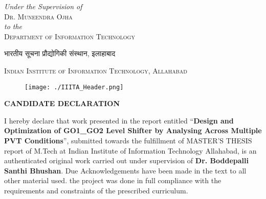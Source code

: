 \begin{spacing}{2.0}
\begin{flushright}
\begin{minipage}{0.5\textwidth}
\begin{titlepage}
\begin{center}
\begin{spacing}{1.2}
\textit{Under the Supervision of}\\[2mm]
\textsc{\Large Dr. Muneendra Ojha}\\%

\vspace{7mm}
\textit{to the}\\[2mm]
\textsc{\Large Department of Information Technology}\\ %

\vspace{8mm}
\begin{hindi}
    \textsc{\Large {भारतीय सूचना प्रौद्योगिकी संस्थान, इलाहाबाद}} \\
\end{hindi}
\vspace{3mm}
\textsc{\Large Indian Institute of Information Technology, Allahabad} %

\vspace{5mm}
{\fontsize{14}{14}\selectfont {}}


\end{spacing}
\end{center}
\end{titlepage}



\checktoopen
\begin{figure}[htp]
    \texttt{[image: ./IIITA\_Header.png]}
\end{figure}
\thispagestyle{empty}
\vspace{1mm}

\begin{center}
    {\large\bfseries CANDIDATE DECLARATION}
\end{center}

\begin{spacing}{1.5}
\vspace{10 pt}
I hereby declare that work presented in the report entitled “\textbf{Design and Optimization of GO1\_GO2 Level Shifter by Analysing Across Multiple PVT Conditions}”, submitted towards the fulfillment of MASTER’S THESIS report of M.Tech at Indian Institute of Information Technology Allahabad, is an authenticated original work carried out under supervision of \textbf{Dr. Boddepalli Santhi Bhushan}. Due Acknowledgements have been made in the text to all other material used. the project was done in full compliance with the requirements and constraints of the prescribed curriculum. 
\end{spacing}


\end{minipage}
\end{flushright}
\end{spacing}
